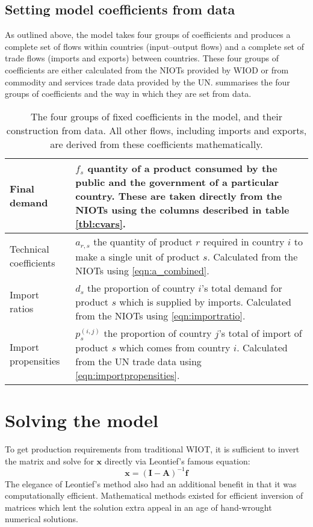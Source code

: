 \documentclass[a4paper]{article}
\begin{document}
\subsection{Setting model coefficients from data}
As outlined above, the model takes four groups of coefficients and produces a complete set of flows within countries (input--output flows) and a complete set of trade flows (imports and exports) between countries.
These four groups of coefficients are either calculated from the NIOTs provided by WIOD or from commodity and services trade data provided by the UN.
 summarises the four groups of coefficients and the way in which they are set from data.
\begin{table}
    \centering
    \begin{tabular}{lp{8cm}}
        \toprule
    Final demand &  $f_s$ quantity of a product consumed by the public and the government of a
    particular country.
    These are taken directly from the NIOTs using the columns described in table \ref{tbl:cvars}. \\
    \midrule
    Technical coefficients &  $a_{r,s}$ the quantity of product $r$ required in country $i$
    to make a single unit of product $s$. Calculated from the NIOTs using \cref{eqn:a_combined}. \\
    \midrule
    Import ratios &  $d_s$ the proportion of country $i$'s total demand for product $s$ which is
    supplied by imports. Calculated from the NIOTs using \cref{eqn:importratio}. \\
    \midrule
    Import propensities &  $p_s^{(i,j)}$ the proportion of country $j$'s total of import of
    product $s$ which comes from country $i$. Calculated from the UN trade data using
    \cref{eqn:importpropensities}.\\
    \bottomrule
    \end{tabular}
    \caption{The four groups of fixed coefficients in the model, and their construction from data.
    All other flows, including imports and exports, are derived from these coefficients  mathematically.}
    \label{tbl:the_four_things}
\end{table}



\section{Solving the model}\label{sec:algorithm}
To get production requirements from traditional WIOT, it is sufficient to invert the matrix and solve for $\boldsymbol{x}$ directly via Leontief's famous equation:
\begin{equation}
\boldsymbol{x} = (\boldsymbol{I}- \boldsymbol{A})^{-1}\boldsymbol{f}
\end{equation}
The elegance of Leontief's method also had an additional benefit in that it was computationally efficient.
Mathematical methods existed for efficient inversion of matrices which lent the solution extra appeal in an age of hand-wrought numerical solutions.
\end{document}
